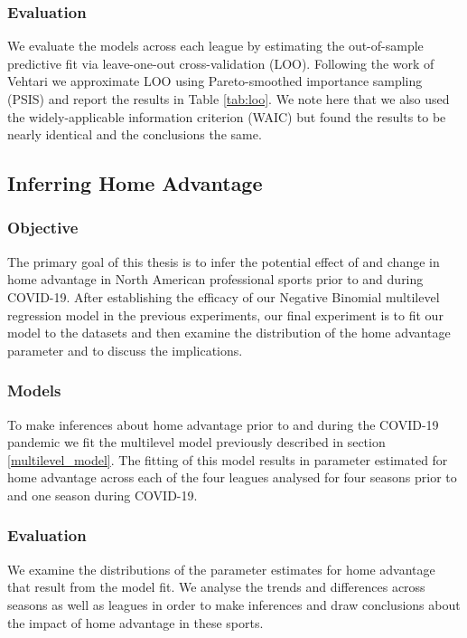 \subsubsection*{Evaluation}

We evaluate the models across each league by estimating the out-of-sample predictive fit via leave-one-out cross-validation (LOO). Following the work of Vehtari \cite{Vehtari2016} we approximate LOO using Pareto-smoothed importance sampling (PSIS) and report the results in Table \ref{tab:loo}. We note here that we also used the widely-applicable information criterion (WAIC) \cite{Watanabe2010} but found the results to be nearly identical and the conclusions the same.

\subsection{Inferring Home Advantage}

\subsubsection*{Objective}

The primary goal of this thesis is to infer the potential effect of and change in home advantage in North American professional sports prior to and during COVID-19. After establishing the efficacy of our Negative Binomial multilevel regression model in the previous experiments, our final experiment is to fit our model to the datasets and then examine the distribution of the home advantage parameter and to discuss the implications.

\subsubsection*{Models}

To make inferences about home advantage prior to and during the COVID-19 pandemic we fit the multilevel model previously described in section \ref{multilevel_model}. The fitting of this model results in parameter estimated for home advantage across each of the four leagues analysed for four seasons prior to and one season during COVID-19.

\subsubsection*{Evaluation}

We examine the distributions of the parameter estimates for home advantage that result from the model fit. We analyse the trends and differences across seasons as well as leagues in order to make inferences and draw conclusions about the impact of home advantage in these sports.